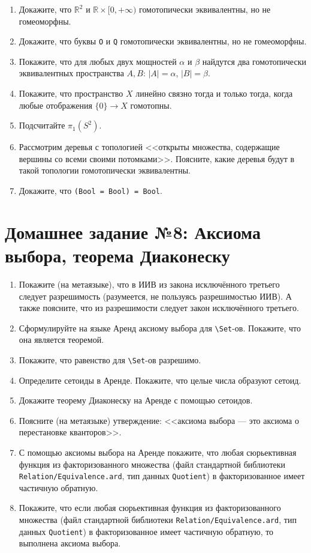 \documentclass[10pt,a4paper,oneside]{article}
\begin{document}
\begin{enumerate}
\item Докажите, что $\mathbb{R}^2$ и $\mathbb{R}\times [0,+\infty)$ гомотопически эквивалентны, но не гомеоморфны.
\item Докажите, что буквы \verb!O! и \verb!Q! гомотопически эквивалентны, но не гомеоморфны.
\item Покажите, что для любых двух мощностей $\alpha$ и $\beta$ найдутся два гомотопически эквивалентных пространства $A, B$: $|A|=\alpha$,
$|B|=\beta$.
\item Покажите, что пространство $X$ линейно связно тогда и только тогда, когда любые отображения $\{0\} \rightarrow X$ гомотопны.
\item Подсчитайте $\pi_1(S^2)$.
\item Рассмотрим деревья с топологией <<открыты множества, содержащие вершины со всеми своими потомками>>. Поясните, какие деревья
будут в такой топологии гомотопически эквивалентны.
\item Докажите, что \verb!(Bool = Bool) = Bool!.
\end{enumerate}

\section*{Домашнее задание №8: Аксиома выбора, теорема Диаконеску}
\begin{enumerate}
\item Покажите (на метаязыке), что в ИИВ из закона исключённого третьего следует разрешимость (разумеется, не пользуясь разрешимостью ИИВ).
А также поясните, что из разрешимости следует закон исключённого третьего.
\item Сформулируйте на языке Аренд аксиому выбора для \verb!\Set!-ов. Покажите, что она является теоремой.
\item Покажите, что равенство для \verb!\Set!-ов разрешимо.
\item Определите сетоиды в Аренде. Покажите, что целые числа образуют сетоид.
\item Докажите теорему Диаконеску на Аренде с помощью сетоидов.
\item Поясните (на метаязыке) утверждение: <<аксиома выбора --- это аксиома о перестановке кванторов>>.
\item С помощью аксиомы выбора на Аренде покажите, что любая сюрьективная функция из факторизованного множества (файл стандартной
библиотеки \verb!Relation/Equivalence.ard!, тип данных \verb!Quotient!) в факторизованное имеет частичную обратную.
\item Покажите, что если любая сюрьективная функция из факторизованного множества (файл стандартной
библиотеки \verb!Relation/Equivalence.ard!, тип данных \verb!Quotient!) в факторизованное имеет частичную обратную, то выполнена аксиома выбора.
\end{enumerate}
\end{document}
